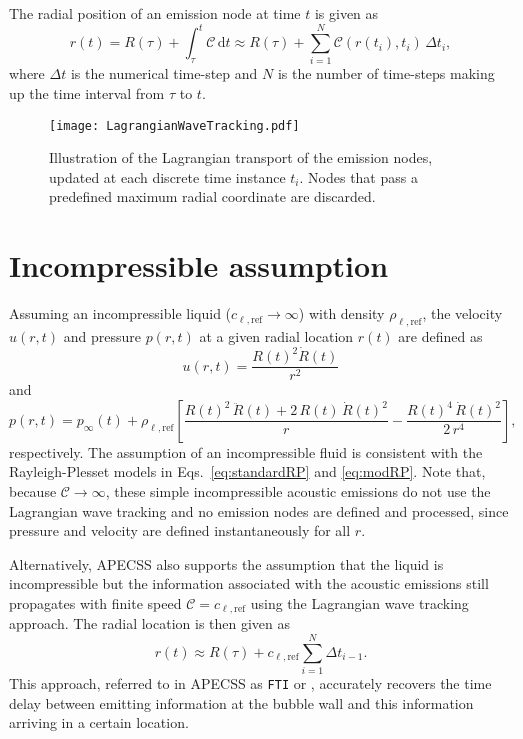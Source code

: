 The radial position of an emission node at time $t$ is given as
\begin{equation}
    r(t) = R(\tau) + \int_\tau^t \mathcal{C} \, \mathrm{d}t \approx R(\tau) + \sum_{i=1}^N \mathcal{C}(r(t_{i}),t_{i})  \, \Delta t_{i}, 
    \label{eq:r_t}
\end{equation}
where $\Delta t$ is the numerical time-step and $N$ is the number of time-steps making up the time interval from $\tau$ to $t$. 

\begin{figure}
    \begin{center}
    \texttt{[image: LagrangianWaveTracking.pdf]}
    \caption{Illustration of the Lagrangian transport of the emission nodes, updated at each discrete time instance $t_i$. Nodes that pass a predefined maximum radial coordinate are discarded.}
    \label{fig:lagrangiantracking}
    \end{center}
\end{figure}

\section{Incompressible assumption}

Assuming an incompressible liquid ($c_{\ell,\mathrm{ref}} \rightarrow  \infty$) with density $\rho_{\ell,\mathrm{ref}}$, the velocity $u(r,t)$ and pressure $p(r,t)$ at a given radial location $r(t)$ are defined as \citep{Neppiras1980}
\begin{equation}
    u(r,t) = \frac{R(t)^2 \dot{R}(t)}{r^2}  \label{eq:u_rt_incomp} 
\end{equation}
and 
\begin{equation}
    p(r,t) = p_\infty(t) + \rho_{\ell,\mathrm{ref}} \left[\frac{R(t)^2 \, \ddot{R}(t) + 2 \, R(t) \, \dot{R}(t)^2}{r} - \frac{R(t)^4 \, \dot{R}(t)^2}{2 \, r^4} \right], \label{eq:p_rt_incomp}
\end{equation}
respectively. The assumption of an incompressible fluid is consistent with the Rayleigh-Plesset models in Eqs.~\eqref{eq:standardRP} and \eqref{eq:modRP}. Note that, because $\mathcal{C} \rightarrow \infty$, these simple incompressible acoustic emissions do not use the Lagrangian wave tracking and no emission nodes are defined and processed, since pressure and velocity are defined instantaneously for all $r$.

Alternatively, APECSS also supports the assumption that the liquid is incompressible but the information associated with the acoustic emissions still propagates with finite speed $\mathcal{C} = c_{\ell,\mathrm{ref}}$ using the Lagrangian wave tracking approach. 
The radial location is then given as
\begin{equation}
    r(t) \approx R(\tau) + c_{\ell,\mathrm{ref}} \sum_{i=1}^N \Delta t_{i-1}. \label{eq:r_t_fti}
\end{equation}
This approach, referred to in APECSS as {\tt FTI} or , accurately recovers the time delay between emitting information at the bubble wall and this information arriving in a certain location.

